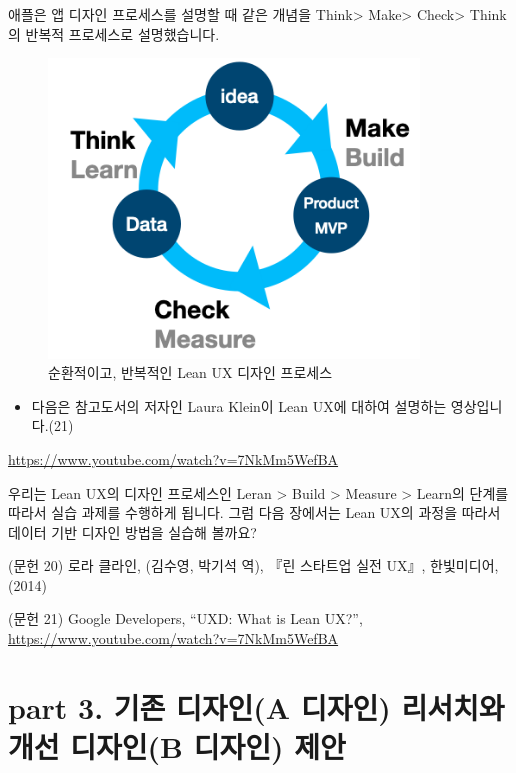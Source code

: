 \documentclass[
  letterpaper,
]{book}
\providecommand{\tightlist}{%
  \setlength{\itemsep}{0pt}\setlength{\parskip}{0pt}}\usepackage{longtable,booktabs,array}
\begin{document}
애플은 앱 디자인 프로세스를 설명할 때 같은 개념을 Think\textgreater{}
Make\textgreater{} Check\textgreater{} Think의 반복적 프로세스로
설명했습니다.

\begin{figure}[H]

{\centering \includegraphics[width=3.875in,height=\textheight]{img/fig21.png}

}

\caption{순환적이고, 반복적인 Lean UX 디자인 프로세스}

\end{figure}%

\begin{itemize}
\tightlist
\item
  다음은 참고도서의 저자인 Laura Klein이 Lean UX에 대하여 설명하는
  영상입니다.(21)
\end{itemize}

\url{https://www.youtube.com/watch?v=7NkMm5WefBA}

우리는 Lean UX의 디자인 프로세스인 Leran \textgreater{} Build
\textgreater{} Measure \textgreater{} Learn의 단계를 따라서 실습 과제를
수행하게 됩니다. 그럼 다음 장에서는 Lean UX의 과정을 따라서 데이터 기반
디자인 방법을 실습해 볼까요?

(문헌 20) 로라 클라인, (김수영, 박기석 역), 『린 스타트업 실전 UX』,
한빛미디어,(2014)

(문헌 21) Google Developers, ``UXD: What is Lean UX?'',
\url{https://www.youtube.com/watch?v=7NkMm5WefBA}

\part{\textbf{part 3. 기존 디자인(A 디자인) 리서치와 개선 디자인(B
디자인) 제안}}
\end{document}
